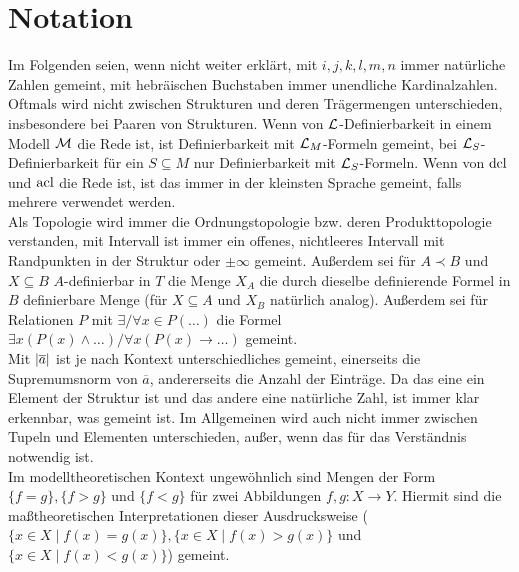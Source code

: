 \section*{Notation}
Im Folgenden seien, wenn nicht weiter erklärt, mit $i,j,k,l,m,n$ immer natürliche Zahlen gemeint, mit hebräischen Buchstaben immer unendliche Kardinalzahlen.\\
Oftmals wird nicht zwischen Strukturen und deren Trägermengen unterschieden, insbesondere bei Paaren von Strukturen. Wenn von $\mathcal{L}$-Definierbarkeit in einem Modell $\mathcal{M}$ die Rede ist, ist Definierbarkeit mit $\mathcal{L}_M$-Formeln gemeint, bei $\mathcal{L}_S$-Definierbarkeit für ein $S\subseteq M$ nur Definierbarkeit mit $\mathcal{L}_S$-Formeln. Wenn von $\operatorname{dcl}$ und $\operatorname{acl}$ die Rede ist, ist das immer in der kleinsten Sprache gemeint, falls mehrere verwendet werden.\\
Als Topologie wird immer die Ordnungstopologie bzw. deren Produkttopologie verstanden, mit \glqq{}Intervall\grqq{} ist immer ein offenes, nichtleeres Intervall mit Randpunkten in der Struktur oder $\pm\infty$ gemeint. Außerdem sei für $A\prec B$ und $X\subseteq B$ $A$-definierbar in $T$ die Menge $X_A$ die durch dieselbe definierende Formel in $B$ definierbare Menge (für $X\subseteq A$ und $X_B$ natürlich analog). Außerdem sei für Relationen $P$ mit \glqq{}$\exists/\forall x\in P(\dots)$\grqq{} die Formel \glqq{}$\exists x(P(x)\land\dots)/\forall x(P(x)\rightarrow\dots)$\grqq{} gemeint.\\
Mit ${\left| \overline{a} \right|}$ ist je nach Kontext unterschiedliches gemeint, einerseits die Supremumsnorm von $\overline{a}$, andererseits die Anzahl der Einträge. Da das eine ein Element der Struktur ist und das andere eine natürliche Zahl, ist immer klar erkennbar, was gemeint ist. Im Allgemeinen wird auch nicht immer zwischen Tupeln und Elementen unterschieden, außer, wenn das für das Verständnis notwendig ist.\\
Im modelltheoretischen Kontext ungewöhnlich sind Mengen der Form $\{f=g\},\{f>g\}$ und $\{f<g\}$ für zwei Abbildungen $f,g:X\rightarrow Y$. Hiermit sind die maßtheoretischen Interpretationen dieser Ausdrucksweise ($\{x\in X\mid f(x)=g(x)\},\{x\in X\mid f(x)>g(x)\}$ und $\{x\in X\mid f(x)<g(x)\}$) gemeint.